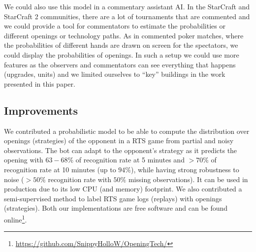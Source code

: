 We could also use this model in a commentary assistant AI. In the StarCraft and StarCraft 2 communities, there are a lot of  tournaments that are commented and we could provide a tool for commentators to estimate the probabilities or different openings or technology paths. As in commented poker matches, where the probabilities of different hands are drawn on screen for the spectators, we could display the probabilities of openings. In such a setup we could use more features as the observers and commentators can see everything that happens (upgrades, units) and we limited ourselves to ``key'' buildings in the work presented in this paper.

\subsection{Improvements}

We contributed a probabilistic model to be able to compute the distribution over openings (strategies) of the opponent in a RTS game from partial and noisy observations. %
The bot can adapt to the opponent's strategy as it predicts the opening with $63-68\%$ of recognition rate at 5 minutes and $>70\%$ of recognition rate at 10 minutes (up to $94\%$), while having strong robustness to noise ($>50\%$ recognition rate with $50\%$ missing observations). It can be used in production due to its low CPU (and memory) footprint. We also contributed a semi-supervised method to label RTS game logs (replays) with openings (strategies). Both our implementations are free software and can be found online\footnote{\url{https://github.com/SnippyHolloW/OpeningTech/}}. %
